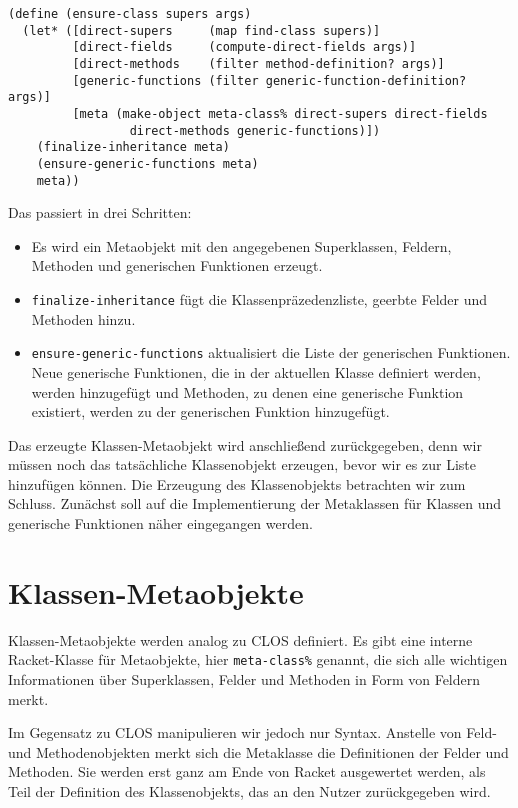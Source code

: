 \begin{lstlisting}
(define (ensure-class supers args)
  (let* ([direct-supers     (map find-class supers)]  
         [direct-fields     (compute-direct-fields args)]
         [direct-methods    (filter method-definition? args)]
         [generic-functions (filter generic-function-definition? args)]
         [meta (make-object meta-class% direct-supers direct-fields
                 direct-methods generic-functions)])
    (finalize-inheritance meta)
    (ensure-generic-functions meta)
    meta))
\end{lstlisting}


Das passiert in drei Schritten:
\begin{itemize}
 \item Es wird ein Metaobjekt mit den angegebenen Superklassen, Feldern, Methoden und generischen Funktionen erzeugt.
 \item \texttt{finalize-inheritance} fügt die Klassenpräzedenzliste, geerbte Felder und Methoden hinzu.
 \item \texttt{ensure-generic-functions} aktualisiert die Liste der generischen Funktionen. Neue generische Funktionen, die in der aktuellen Klasse definiert werden, werden hinzugefügt und Methoden, zu denen eine generische Funktion existiert, werden zu der generischen Funktion hinzugefügt.
\end{itemize}

Das erzeugte Klassen-Metaobjekt wird anschließend zurückgegeben, denn wir müssen noch das tatsächliche Klassenobjekt erzeugen, bevor wir es zur Liste hinzufügen können. Die Erzeugung des Klassenobjekts betrachten wir zum Schluss. Zunächst soll auf die Implementierung der Metaklassen für Klassen und generische Funktionen näher eingegangen werden.

\section{Klassen-Metaobjekte}
Klassen-Metaobjekte werden analog zu CLOS definiert. Es gibt eine interne Racket-Klasse für Metaobjekte, hier \texttt{meta-class\%} genannt, die sich alle wichtigen Informationen über Superklassen, Felder und Methoden in Form von Feldern merkt.

Im Gegensatz zu CLOS manipulieren wir jedoch nur Syntax. Anstelle von Feld- und Methodenobjekten merkt sich die Metaklasse die Definitionen der Felder und Methoden. Sie werden erst ganz am Ende von Racket ausgewertet werden, als Teil der Definition des Klassenobjekts, das an den Nutzer zurückgegeben wird.

